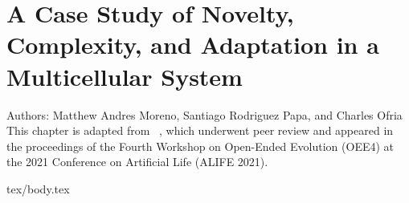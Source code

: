 \chapter{A Case Study of Novelty, Complexity, and Adaptation in a Multicellular System}
\label{ch:measuring-cna}

\noindent
Authors: Matthew Andres Moreno, Santiago Rodriguez Papa, and Charles Ofria \\
This chapter is adapted from ~\citep{moreno2021case}, which underwent peer review and appeared in the proceedings of the Fourth Workshop on Open-Ended Evolution (OEE4) at the 2021 Conference on Artificial Life (ALIFE 2021).

{tex/body.tex}
